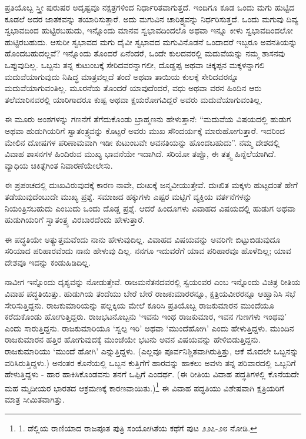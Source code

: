 ಪ್ರತಿಯೊಬ್ಬ ಸ್ತ್ರೀ ಪುರುಷರ ಅದೃಷ್ಟವೂ ನಕ್ಷತ್ರಗಳಿಂದ ನಿರ್ಧಾರಿತವಾಗುತ್ತದೆ. ಇಂದಿಗೂ ಕೂಡ ಒಂದು ಮಗು ಹುಟ್ಟಿದ ಕೂಡಲೆ ಅದರ ಜಾತಕವನ್ನು ತಯಾರಿಸುತ್ತಾರೆ. ಅದು ಮಗುವಿನ ಚಾರಿತ್ರ್ಯವನ್ನು ನಿರ್ಧರಿಸುತ್ತದೆ. ಒಂದು ಮಗುವು ದಿವ್ಯ ಸ್ವಭಾವದಿಂದ ಹುಟ್ಟಿರಬಹುದು, ಇನ್ನೊಂದು ಮಾನವ ಸ್ವಭಾವದಿಂದಲೊ ಅಥವಾ ಇನ್ನೂ ಕೀಳು ಸ್ವಭಾವದಿಂದಲೋ ಹುಟ್ಟಿರಬಹುದು. ಆಸುರೀ ಸ್ವಭಾವದ ಮಗು ದೈವೀ ಸ್ವಭಾವದ ಮಗುವಿನೊಡನೆ ಒಂದಾದರೆ ಇಬ್ಬರೂ ಅವನತಿಯನ್ನು ಹೊಂದಬಹುದಲ್ಲವೆ? ಇನ್ನೊಂದು ತೊಂದರೆ ಏನೆಂದರೆ, ಒಂದೇ ಕುಲದವರಲ್ಲಿ ಮದುವೆಯನ್ನು ನಮ್ಮ ಶಾಸನವು ಒಪ್ಪುವುದಿಲ್ಲ. ಒಬ್ಬನು ತನ್ನ ಕುಟುಂಬಕ್ಕೆ ಸೇರಿದವರನ್ನಾಗಲೀ, ದೊಡ್ಡಪ್ಪ ಅಥವಾ ಚಿಕ್ಕಪ್ಪನ ಮಕ್ಕಳನ್ನಾಗಲಿ ಮದುವೆಯಾಗುವುದು ನಿಷಿದ್ಧ ಮಾತ್ರವಲ್ಲದೆ ತಂದೆ ಅಥವಾ ತಾಯಿಯ ಕುಲಕ್ಕೆ ಸೇರಿದವರನ್ನೂ ಮದುವೆಯಾಗುವಂತಿಲ್ಲ. ಮೂರನೆಯ ತೊಂದರೆ ಯಾವುದೆಂದರೆ, ವಧು ಅಥವಾ ವರನ ಹಿಂದಿನ ಆರು ತಲೆಮಾರಿನವರಲ್ಲಿ ಯಾರಿಗಾದರೂ ಕುಷ್ಟ ಅಥವಾ ಕ್ಷಯರೋಗವಿದ್ದರೆ ಅವರು ಮದುವೆಯಾಗುವಂತಿಲ್ಲ.

ಈ ಮೂರು ಅಂಶಗಳನ್ನು ಗಣನೆಗೆ ತೆಗೆದುಕೊಂಡು ಬ್ರಾಹ್ಮಣನು ಹೇಳುತ್ತಾನೆ: “ಮದುವೆಯ ವಿಷಯದಲ್ಲಿ ಹುಡುಗ ಅಥವಾ ಹುಡುಗಿಯರಿಗೆ ಸ್ವಾತಂತ್ರ್ಯವನ್ನು ಕೊಟ್ಟರೆ ಅವರು ಮುಖ ಸೌಂದರ್ಯಕ್ಕೆ ಮಾರುಹೋಗುತ್ತಾರೆ. ಇದರಿಂದ ಮೇಲಿನ ದೋಷಗಳ ಪರಿಣಾಮವಾಗಿ ಇಡೀ ಕುಟುಂಬವೇ ಅವನತಿಯನ್ನು ಹೊಂದಬಹುದು”. ನಮ್ಮ ದೇಶದಲ್ಲಿ ವಿವಾಹ ಶಾಸನಗಳ ಹಿಂದಿರುವ ಮುಖ್ಯ ಭಾವನೆಯೇ ಇದಾಗಿದೆ. ಸರಿಯೋ ತಪ್ಪೊ, ಈ ತತ್ತ್ವ ಹಿನ್ನೆಲೆಯಾಗಿದೆ. ವ್ಯಾಧಿಯ ಚಿಕಿತ್ಸೆಗಿಂತ ನಿವಾರಣೆಯೇಲೇಸು.

ಈ ಪ್ರಪಂಚದಲ್ಲಿ ದುಃಖವಿರುವುದಕ್ಕೆ ಕಾರಣ ನಾವೇ, ದುಃಖಕ್ಕೆ ಜನ್ಮವೀಯುತ್ತೇವೆ. ದುಃಖಿತ ಮಕ್ಕಳು ಹುಟ್ಟದಂತೆ ಹೇಗೆ ತಡೆಯುವುದೆಂಬುದೇ ಮುಖ್ಯ ಪ್ರಶ್ನೆ. ಸಮಾಜದ ಹಕ್ಕುಗಳು ಎಷ್ಟರ ಮಟ್ಟಿಗೆ ವ್ಯಕ್ತಿಯ ವರ್ತನೆಗಳನ್ನು ನಿಯಂತ್ರಿಸಬಹುದು ಎಂಬುದು ಒಂದು ದೊಡ್ಡ ಪ್ರಶ್ನೆ. ಆದರೆ ಹಿಂದೂಗಳು ವಿವಾಹದ ವಿಷಯದಲ್ಲಿ ಹುಡುಗ ಅಥವಾ ಹುಡುಗಿಯರಿಗೆ ಸ್ವಾತಂತ್ರ್ಯ ವಿರಬಾರದೆಂದು ಹೇಳುತ್ತಾರೆ.

ಈ ಪದ್ಧತಿಯೇ ಅತ್ಯುತ್ತಮವೆಂದು ನಾನು ಹೇಳುವುದಿಲ್ಲ. ವಿವಾಹದ ವಿಷಯವನ್ನು ಅವರಿಗೇ ಬಿಟ್ಟುಬಿಡುವುದೂ ಸರಿಯಾದ ಪರಿಹಾರವೆಂದು ನಾನು ಹೇಳುವು ದಿಲ್ಲ. ನನಗೂ ಇದುವರೆಗೆ ಯಾವ ಪರಿಹಾರವೂ ಹೊಳೆದಿಲ್ಲ; ಯಾವ ದೇಶವೂ ಇದನ್ನು ಕಂಡುಹಿಡಿದಿಲ್ಲ.

ನಾವೀಗ ಇನ್ನೊಂದು ದೃಶ್ಯವನ್ನು ನೋಡುತ್ತೇವೆ. ರಾಜಮನೆತನದವರಲ್ಲಿ ಸ್ವಯಂವರ ಎಂಬ ಇನ್ನೊಂದು ವಿಚಿತ್ರ ರೀತಿಯ ವಿವಾಹ ಪದ್ಧತಿಯಿತ್ತು. ಹುಡುಗಿಯ ತಂದೆಯು ಬೇರೆ ಬೇರೆ ರಾಜಕುಮಾರರನ್ನೂ, ಕ್ಷತ್ರಿಯವೀರರನ್ನೂ ಆಹ್ವಾನಿಸಿ ಸಭೆ ಸೇರಿಸುತ್ತಿದ್ದನು. ರಾಜಕುಮಾರಿಯನ್ನು ಪಲ್ಲಕ್ಕಿಯ ಮೇಲೆ ಕೂರಿಸಿ ಪ್ರತಿಯೊಬ್ಬ ರಾಜಕುಮಾರನ ಮುಂದೆಯೂ ಕರೆದುಕೊಂಡು ಹೋಗುತ್ತಿದ್ದರು. ರಾಜಭಟನೊಬ್ಬನು ‘ಇವನು ಇಂಥ ರಾಜಕುಮಾರ, ಇವನ ಗುಣಗಳು ಇಂಥವು’ ಎಂದು ಸಾರುತ್ತಿದ್ದನು. ರಾಜಕುಮಾರಿಯೂ ‘ಸ್ವಲ್ಪ ಇರಿ’ ಅಥವಾ ‘ಮುಂದೆಹೋಗಿ’ ಎಂದು ಹೇಳುತ್ತಿದ್ದಳು. ಮುಂದಿನ ರಾಜಕುಮಾರನ ಹತ್ತಿರ ಹೋಗುವುದಕ್ಕೆ ಮುಂಚೆಯೇ ಭಟನು ಅವನ ವಿಷಯವನ್ನು ಹೇಳಿಬಿಡುತ್ತಿದ್ದನು. ರಾಜಕುಮಾರಿಯು ‘ಮುಂದೆ ಹೋಗಿ’ ಎನ್ನುತ್ತಿದ್ದಳು. (ಎಲ್ಲವೂ ಪೂರ್ವನಿಶ್ಚಿತವಾಗಿರುತ್ತಿತ್ತು, ಆಕೆ ಮೊದಲೇ ಒಬ್ಬನನ್ನು ವರಿಸಿರುತ್ತಿದ್ದಳು.) ಅನಂತರ ಕೊನೆಯಲ್ಲಿ ಒಬ್ಬನ ಕುತ್ತಿಗೆಗೆ ಹಾರವನ್ನು ಹಾಕಲು ಅವಳು ತನ್ನ ಪರಿವಾರದಲ್ಲಿ ಒಬ್ಬನಿಗೆ ಹೇಳುತ್ತಿದ್ದಳು - ಹಾರ ಹಾಕಿಸಿಕೊಂಡವನು ತನಗೆ ಒಪ್ಪಿಗೆ ಎಂದರ್ಥ. (ಈ ರೀತಿಯ ವಿವಾಹ ಪದ್ಧತಿಗಳಲ್ಲಿ ಕೊನೆಯದೇ ಮಹ ಮ್ಮದೀಯರ ಭಾರತದ ಆಕ್ರಮಣಕ್ಕೆ ಕಾರಣವಾಯಿತು.)\footnote{1. ಡೆಲ್ಲಿಯ ರಾಣಿಯಾದ ರಾಜಪೂತ ಪುತ್ರಿ ಸಂಯೋಗಿತೆಯ ಕಥೆಗೆ ಪುಟ ೨೨೭-೨೮ ನೋಡಿ.} ಈ ವಿವಾಹ ಪದ್ಧತಿಯು ವಿಶೇಷವಾಗಿ ಕ್ಷತ್ರಿಯರಿಗೆ ಮಾತ್ರ ಸೀಮಿತವಾಗಿತ್ತು.

